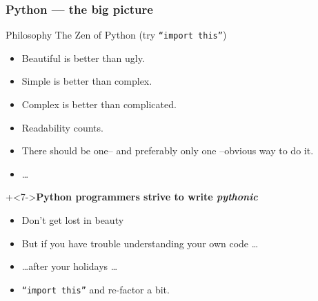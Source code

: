 \documentclass[xcolor=pdftex,dvipsnames,table]{beamer}
\begin{document}
\begin{frame}
  \frametitle{Python --- the big picture}
  \begin{block}{Philosophy}
    The Zen of Python (try \texttt{``import this''})
    \begin{itemize}[<+->]
    \item Beautiful is better than ugly.
    \item Simple is better than complex.
    \item Complex is better than complicated.
    \item Readability counts.
    \item There should be one-- and preferably only one --obvious way to do it.
    \item \ldots
    \end{itemize}
    \onslide+<7->\textbf{Python programmers strive to write \textit{pythonic}}
    \begin{itemize}[<8->]
    \item Don't get lost in beauty
    \item But if you have trouble understanding your own code \ldots
    \item \ldots after your holidays \ldots
    \item \texttt{``import this''} and re-factor a bit.
    \end{itemize}
  \end{block}
\end{frame}
\end{document}
